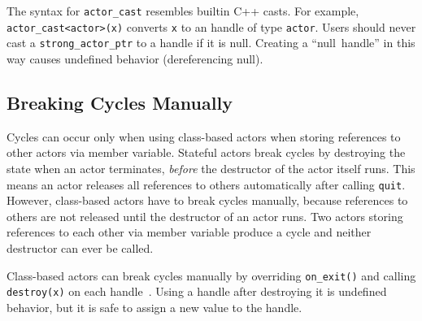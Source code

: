 The syntax for \lstinline^actor_cast^ resembles builtin C++ casts. For example, \lstinline^actor_cast<actor>(x)^ converts \lstinline^x^ to an handle of type \lstinline^actor^. Users should never cast a \lstinline^strong_actor_ptr^ to a handle if it is null. Creating a ``null~handle'' in this way causes undefined behavior (dereferencing null).

\subsection{Breaking Cycles Manually}
\label{breaking-cycles}

Cycles can occur only when using class-based actors when storing references to other actors via member variable. Stateful actors  break cycles by destroying the state when an actor terminates, \emph{before} the destructor of the actor itself runs. This means an actor releases all references to others automatically after calling \lstinline^quit^. However, class-based actors have to break cycles manually, because references to others are not released until the destructor of an actor runs. Two actors storing references to each other via member variable produce a cycle and neither destructor can ever be called.

Class-based actors can break cycles manually by overriding \lstinline^on_exit()^ and calling \lstinline^destroy(x)^ on each handle~. Using a handle after destroying it is undefined behavior, but it is safe to assign a new value to the handle.

